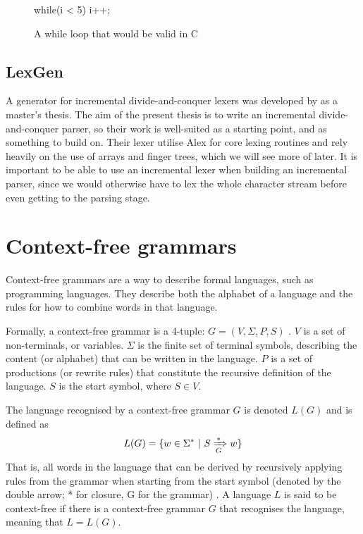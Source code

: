 \documentclass[a4paper,12pt,twosided]{report}
\renewcommand\cite{\citep}
\begin{document}
\begin{figure}[H]
\begin{code}
while(i < 5) {
    i++;
}
\end{code}
\caption{A while loop that would be valid in C}
\label{lexsample}
\end{figure}

\subsection{LexGen}
A generator for incremental divide-and-conquer lexers was developed by
\citet{divconqlex} as a master's thesis. The aim of the present thesis is to
write an incremental divide-and-conquer parser, so their work is well-suited as
a starting point, and as something to build on. Their lexer utilise Alex
\cite{alex} for core lexing routines and rely heavily on the use of arrays and
finger trees, which we will see more of later. It is important to be able to use
an incremental lexer when building an incremental parser, since we would
otherwise have to lex the whole character stream before even getting to the
parsing stage.

\section{Context-free grammars}
Context-free grammars are a way to describe formal languages, such as
programming languages. They describe both the alphabet of a language and the
rules for how to combine words in that language.

Formally, a context-free grammar is a 4-tuple: $G = (V, \Sigma, P, S)$
\cite[p.171]{automatabook}. $V$ is a set of non-terminals, or variables. $\Sigma$ is
the finite set of terminal symbols, describing the content (or alphabet) that
can be written in the language. $P$ is a set of productions (or rewrite rules)
that constitute the recursive definition of the language. $S$ is the start
symbol, where $S \in V$. 

The language recognised by a context-free grammar $G$ is denoted $L(G)$ and is
defined as 
\[
L(G) = \{w \in \Sigma^* \ |\  S \xRightarrow[G]{*} w\}
\]
That is, all words in the language that can be derived by recursively applying
rules from the grammar when starting from the start symbol (denoted by the
double arrow; * for closure, G for the grammar) \cite[p.  177]{automatabook}. A
language $L$ is said to be context-free if there is a context-free grammar $G$
that recognises the language, meaning that $L = L(G)$.
\end{document}
